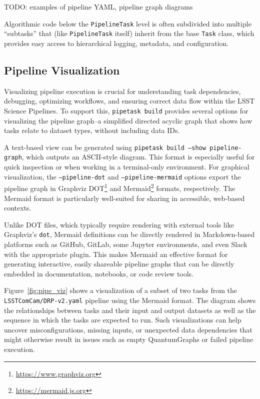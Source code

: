 TODO: examples of pipeline YAML, pipeline graph diagrams

Algorithmic code below the \texttt{PipelineTask} level is often subdivided into multiple ``subtasks'' that (like \texttt{PipelineTask} itself) inherit from the base \texttt{Task} class, which provides easy access to hierarchical logging, metadata, and configuration.

\subsection{Pipeline Visualization}
\label{sec:pipeline_visualization}

Visualizing pipeline execution is crucial for understanding task dependencies, debugging, optimizing workflows, and ensuring correct data flow within the LSST Science Pipelines.
To support this, \texttt{pipetask build} provides several options for visualizing the pipeline graph--a simplified directed acyclic graph that shows how tasks relate to dataset types, without including data IDs.

A text-based view can be generated using \texttt{pipetask build --show pipeline-graph}, which outputs an ASCII-style diagram.
This format is especially useful for quick inspection or when working in a terminal-only environment.
For graphical visualization, the \texttt{--pipeline-dot} and \texttt{--pipeline-mermaid} options export the pipeline graph in Graphviz DOT\footnote{\url{https://www.graphviz.org}} and Mermaid\footnote{\url{https://mermaid.js.org}} formats, respectively.
The Mermaid format is particularly well-suited for sharing in accessible, web-based contexts.

Unlike DOT files, which typically require rendering with external tools like Graphviz's \texttt{dot}, Mermaid definitions can be directly rendered in Markdown-based platforms such as GitHub, GitLab, some Jupyter environments, and even Slack with the appropriate plugin.
This makes Mermaid an effective format for generating interactive, easily shareable pipeline graphs that can be directly embedded in documentation, notebooks, or code review tools.

Figure~\ref{fig:pipe_viz} shows a visualization of a subset of two tasks from the \texttt{LSSTComCam/DRP-v2.yaml} pipeline using the Mermaid format.
The diagram shows the relationships between tasks and their input and output datasets as well as the sequence in which the tasks are expected to run.
Such visualizations can help uncover misconfigurations, missing inputs, or unexpected data dependencies that might otherwise result in issues such as empty QuantumGraphs or failed pipeline execution.

